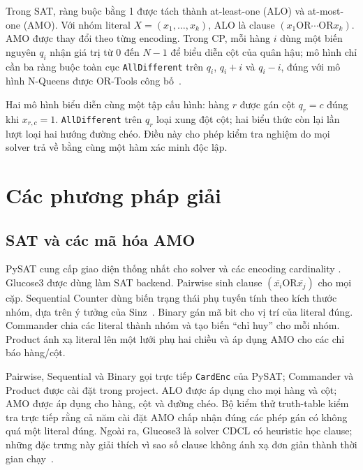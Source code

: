 \documentclass[a4paper,fleqn]{cas-sc}
\providecommand{\ReportPrefix}{}
\begin{document}
Trong SAT, ràng buộc bằng 1 được tách thành at-least-one (ALO) và at-most-one
(AMO). Với nhóm literal $X=(x_1,\ldots,x_k)$, ALO là clause
$(x_1\mathbin{\mathrm{OR}}\cdots\mathbin{\mathrm{OR}}x_k)$. AMO được thay đổi
theo từng encoding. Trong CP, mỗi hàng $i$ dùng một biến nguyên $q_i$ nhận giá
trị từ 0 đến $N-1$ để biểu diễn cột của
quân hậu; mô hình chỉ cần ba ràng buộc toàn cục
\texttt{AllDifferent} trên $q_i$, $q_i+i$ và $q_i-i$, đúng với mô hình N-Queens
được OR-Tools công bố~\cite{ortools-nqueens}.

Hai mô hình biểu diễn cùng một tập cấu hình: hàng $r$ được gán cột $q_r=c$
đúng khi $x_{r,c}=1$. \texttt{AllDifferent} trên $q_r$ loại xung đột cột;
hai biểu thức còn lại lần lượt loại hai hướng đường chéo. Điều này cho phép
kiểm tra nghiệm do mọi solver trả về bằng cùng một hàm xác minh độc lập.

\ifdefined\FullReport

\fi

\section{Các phương pháp giải}

\subsection{SAT và các mã hóa AMO}

PySAT cung cấp giao diện thống nhất cho solver và các encoding cardinality
\cite{pysat-docs,pysat-paper}. Glucose3 được dùng làm SAT backend. Pairwise
sinh clause $(\overline{x_i}\mathbin{\mathrm{OR}}\overline{x_j})$ cho mọi cặp. Sequential Counter dùng
biến trạng thái phụ tuyến tính theo kích thước nhóm, dựa trên ý tưởng của
Sinz~\cite{sinz2005}. Binary gán mã bit cho vị trí của literal đúng. Commander
chia các literal thành nhóm và tạo biến ``chỉ huy'' cho mỗi nhóm. Product ánh
xạ literal lên một lưới phụ hai chiều và áp dụng AMO cho các chỉ báo hàng/cột.

Pairwise, Sequential và Binary gọi trực tiếp \texttt{CardEnc} của PySAT;
Commander và Product được cài đặt trong project. ALO được áp dụng cho mọi hàng
và cột; AMO được áp dụng cho hàng, cột và đường chéo. Bộ kiểm thử truth-table
kiểm tra trực tiếp rằng cả năm cài đặt AMO chấp nhận đúng các phép gán có không
quá một literal đúng. Ngoài ra, Glucose3 là solver CDCL có heuristic học clause;
những đặc trưng này giải thích vì sao số clause không ánh xạ đơn giản thành thời
gian chạy~\cite{glucose2009}.
\end{document}

